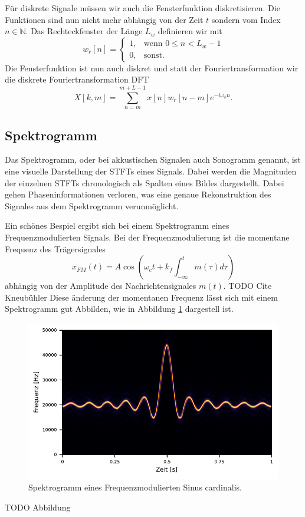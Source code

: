 Für diskrete Signale müssen wir auch die Fensterfunktion diskretisieren.
Die Funktionen sind nun nicht mehr abhängig von der Zeit $t$ sondern vom 
Index $n \in \mathbb{N}$.
Das Rechteckfenster der Länge $L_w$ definieren wir mit
\begin{equation}
    w_r[n] = 
    \begin{cases}
    1,& \text{wenn } 0 \le n < L_w-1\\
    0, & \text{sonst.}
    \end{cases}
\end{equation}
Die Fensterfunktion ist nun auch diskret und statt
der Fouriertransformation wir die diskrete Fouriertransformation DFT
\begin{equation}
    X[k, m] = \sum_{n = m}^{m + L - 1} x[n] w_r[n-m] e^{ -i \omega_k n}.
\end{equation}

\subsection{Spektrogramm}

Das Spektrogramm, oder bei akkustischen Signalen auch Sonogramm genannt, ist eine visuelle
Darstellung der STFTs eines Signals. 
Dabei werden die Magnituden der einzelnen STFTs chronologisch
als Spalten eines Bildes dargestellt.
Dabei gehen Phaseninformationen verloren, was eine genaue Rekonstruktion
des Signales aus dem Spektrogramm verunmöglicht.

Ein schönes Bespiel ergibt sich bei einem Spektrogramm eines Frequenzmodulierten 
Signals.
Bei der Frequenzmodulierung ist die momentane Frequenz des Trägersignales 
\begin{equation}
    x_{FM}(t) = A \cos\left( \omega_c t + k_f \int_{-\infty}^{t} m(\tau) d\tau\right)
\end{equation}
abhängig von der Amplitude des Nachrichtensignales $m(t)$.
TODO Cite Kneubühler
Diese änderung der momentanen Frequenz lässt sich mit einem Spektrogramm gut Abbilden, 
wie in Abbildung \ref{sonogramm:fmsono} dargestell ist.
\begin{figure}
    \centering
    \includegraphics{papers/sonogramm/images/fm_sono_windows.pdf}
    \caption{Spektrogramm eines Frequenzmodulierten Sinus cardinalis.
    \label{sonogramm:fmsono}
    }
\end{figure}
TODO Abbildung
